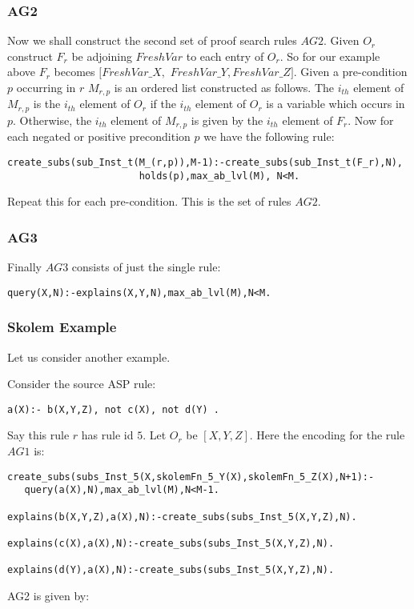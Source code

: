 \documentclass[sigconf]{acmart}
\begin{document}
\subsubsection{AG2}
  Now we shall construct the second set
of proof search rules $AG2$. Given $O_{r}$ construct $F_{r}$ be adjoining
$FreshVar$  to each entry of $O_{r}$. So for our example above $F_{r}$ becomes
$[FreshVar\_X,$ $FreshVar\_Y,FreshVar\_Z]$. Given a pre-condition $p$
occurring in $r$ $M_{r,p}$ is an ordered list constructed as follows. The
$i_{th}$ element of $M_{r,p}$ is the $i_{th}$ element of $O_{r}$ if the
$i_{th}$ element of $O_{r}$ is a variable which occurs in $p$. Otherwise, the
$i_{th}$ element of $M_{r,p}$ is given by the $i_{th}$ element of $F_{r}$. Now
for each negated or positive precondition $p$ we have the following rule:
\begin{lstlisting}[frame=none]
 create_subs(sub_Inst_t(M_(r,p)),M-1):-create_subs(sub_Inst_t(F_r),N),
                       holds(p),max_ab_lvl(M), N<M.   
\end{lstlisting}
Repeat this for each pre-condition. This is the set of rules $AG2$.

\subsubsection{AG3}
Finally $AG3$ consists of just the single rule:
\begin{lstlisting}[frame=none]
query(X,N):-explains(X,Y,N),max_ab_lvl(M),N<M.
\end{lstlisting}

\subsubsection{Skolem Example}
Let us consider another example.

Consider the source ASP rule:
\begin{verbatim}
a(X):- b(X,Y,Z), not c(X), not d(Y) .    
\end{verbatim}
Say this rule $r$ has rule id $5$. 
Let $O_{r}$ be $[X,Y,Z]$. Here the encoding for the rule $AG1$ is:
\begin{lstlisting}[frame=none]
create_subs(subs_Inst_5(X,skolemFn_5_Y(X),skolemFn_5_Z(X),N+1):-
   query(a(X),N),max_ab_lvl(M),N<M-1.

explains(b(X,Y,Z),a(X),N):-create_subs(subs_Inst_5(X,Y,Z),N).

explains(c(X),a(X),N):-create_subs(subs_Inst_5(X,Y,Z),N).

explains(d(Y),a(X),N):-create_subs(subs_Inst_5(X,Y,Z),N).
\end{lstlisting}
AG2 is given by:
\end{document}
